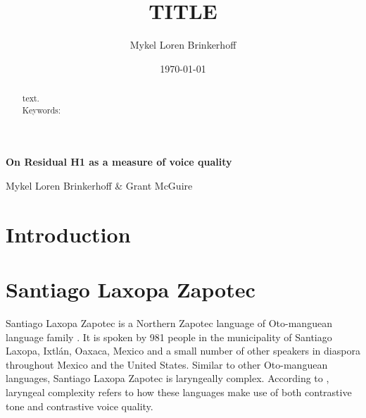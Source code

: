 \documentclass[12pt, letterpaper]{article}
\title{TITLE}
\author{Mykel Loren Brinkerhoff}
\date{\today}
\begin{document}

	\onehalfspacing

\begin{center}
     {\Large \textbf{On Residual H1 as a measure of voice quality}}
     \vspace{6pt}

     Mykel Loren Brinkerhoff \& Grant McGuire
\end{center}
\thispagestyle{fancy}


\begin{abstract}
    text.
    \\
    Keywords:
\end{abstract}

\section{Introduction} \label{sec:Introduction}


\section{Santiago Laxopa Zapotec} \label{sec:SLZ}

Santiago Laxopa Zapotec is a Northern Zapotec language of Oto-manguean language family \citep{adlerAcousticsPhonationTypes2016,adlerDerivationVerbInitiality2018,foleyForbiddenCliticClusters2018,foleyExtendingPersonCaseConstraint2020,sichelPronounsAttractionSierra2020,
sichelFeaturalLifeNominals2020,brinkerhoffDownstepSantiagoLaxopaMFM,brinkerhoffTonalPatternsTheir2022}. It is spoken by 981 people in the municipality of Santiago Laxopa, Ixtlán, Oaxaca, Mexico \citep{SantiagoLaxopaEconomya} and a small number of other speakers in diaspora throughout Mexico and the United States. Similar to other Oto-manguean languages, Santiago Laxopa Zapotec is laryngeally complex. According to \citet{silvermanLaryngealComplexityOtomanguean1997,silvermanPhasingRecoverability1997,blankenshipTimeCourseBreathiness1997,blankenshipTimingNonmodalPhonation2002}, laryngeal complexity refers to how these languages make use of both contrastive tone and contrastive voice quality. 
\end{document}
